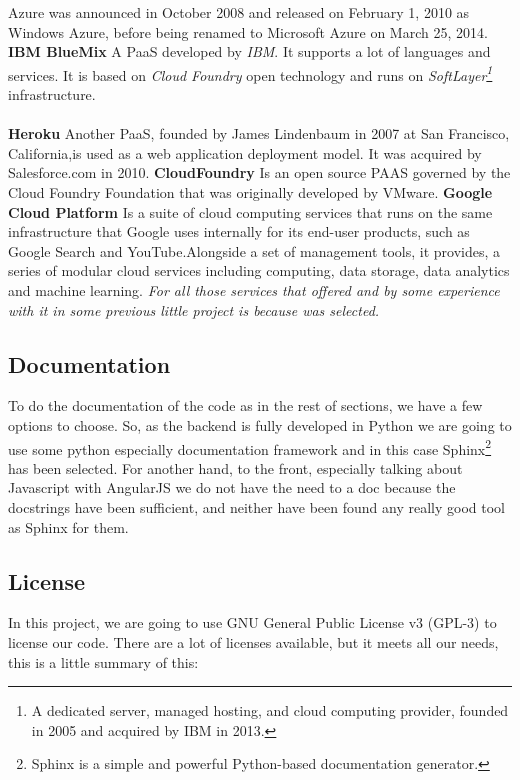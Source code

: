 Azure was announced in October 2008 and released on February 1, 2010 as Windows
Azure, before being renamed to Microsoft Azure on March 25, 2014.
\pagebreak
\textbf{IBM BlueMix}
\intro
A PaaS developed by \textit{IBM}. It supports a lot of languages and services. It is
based on \textit{Cloud Foundry} open technology and runs on
\textit{SoftLayer\footnote{A dedicated server, managed hosting, and cloud
computing provider, founded in 2005 and acquired by IBM in 2013.}} infrastructure.
\\\\
\intro
\textbf{Heroku}
\intro
Another PaaS, founded by James Lindenbaum in 2007 at
San Francisco, California,is used as a web application deployment model.
It was acquired by Salesforce.com in 2010.
\intro
\textbf{CloudFoundry}
\intro Is an open source PAAS governed by the Cloud Foundry Foundation that
was originally developed by VMware.
\intro
\textbf{Google Cloud Platform}
\intro Is a suite of cloud computing services
that runs on the same infrastructure that Google uses internally for its end-user
products, such as Google Search and YouTube.Alongside a set of management tools,
it provides, a series of modular cloud services including computing, data storage,
data analytics and machine learning.
\intro
\textit{For all those services that offered and by some experience with it in
some previous little project is because was selected.}

\subsection{Documentation}

To do the documentation of the code as in the rest of sections, we have a few options
to choose. So, as the backend is fully developed in Python we are going to use some python
especially documentation framework and in this case Sphinx\footnote{Sphinx is a
simple and powerful Python-based documentation generator.} has been selected.
\intro
For another hand, to the front, especially talking about Javascript with AngularJS
we do not have the need to a doc because the docstrings have been sufficient,
and neither have been found any really good tool as Sphinx for them. \pagebreak

\subsection{License}

In this project, we are going to use GNU General Public License v3 (GPL-3)
to license our code.
There are a lot of licenses available, but it meets all our needs,
this is a little summary of this:

